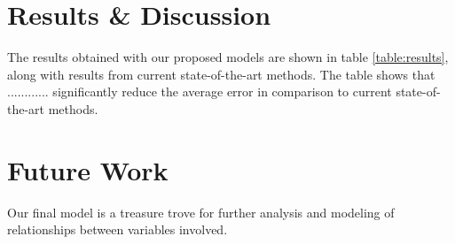 \documentclass[conference]{IEEEtran}
\begin{document}
\begin{table} [!h]
\centering
{} \vspace{0.25cm}
    \caption{ Results compared to state of the art}
\label{table:results}
\end{table}

\section{Results \& Discussion}
The results obtained with our proposed models are shown in table \ref{table:results}, along with results from current state-of-the-art methods. The table shows that ............ significantly reduce the average error in comparison to current state-of-the-art methods. 

\section{Future Work}
Our final model is a treasure trove for further analysis and modeling of relationships between variables involved.
\end{document}
